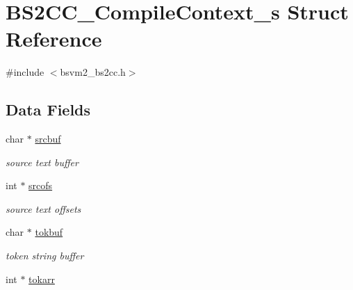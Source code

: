 \hypertarget{structBS2CC__CompileContext__s}{\section{B\-S2\-C\-C\-\_\-\-Compile\-Context\-\_\-s Struct Reference}
\label{structBS2CC__CompileContext__s}
}


{\ttfamily \#include $<$bsvm2\-\_\-bs2cc.\-h$>$}

\subsection*{Data Fields}
\begin{DoxyCompactItemize}
\item 
\hypertarget{structBS2CC__CompileContext__s_aa3bb3215b79552296e75ef61a1499c10}{char $\ast$ \hyperlink{structBS2CC__CompileContext__s_aa3bb3215b79552296e75ef61a1499c10}{srcbuf}}\label{structBS2CC__CompileContext__s_aa3bb3215b79552296e75ef61a1499c10}

\begin{DoxyCompactList}\small\item\em source text buffer \end{DoxyCompactList}\item 
\hypertarget{structBS2CC__CompileContext__s_a9186b8d9bd1368395f61b5d18afdbf86}{int $\ast$ \hyperlink{structBS2CC__CompileContext__s_a9186b8d9bd1368395f61b5d18afdbf86}{srcofs}}\label{structBS2CC__CompileContext__s_a9186b8d9bd1368395f61b5d18afdbf86}

\begin{DoxyCompactList}\small\item\em source text offsets \end{DoxyCompactList}\item 
\hypertarget{structBS2CC__CompileContext__s_a63c34a9d3efa4da7e9369e43419cce91}{char $\ast$ \hyperlink{structBS2CC__CompileContext__s_a63c34a9d3efa4da7e9369e43419cce91}{tokbuf}}\label{structBS2CC__CompileContext__s_a63c34a9d3efa4da7e9369e43419cce91}

\begin{DoxyCompactList}\small\item\em token string buffer \end{DoxyCompactList}\item 
\hypertarget{structBS2CC__CompileContext__s_ac390bc0f0e97fc65b95f306fc0054926}{int $\ast$ \hyperlink{structBS2CC__CompileContext__s_ac390bc0f0e97fc65b95f306fc0054926}{tokarr}}\label{structBS2CC__CompileContext__s_ac390bc0f0e97fc65b95f306fc0054926}


\end{DoxyCompactItemize}
